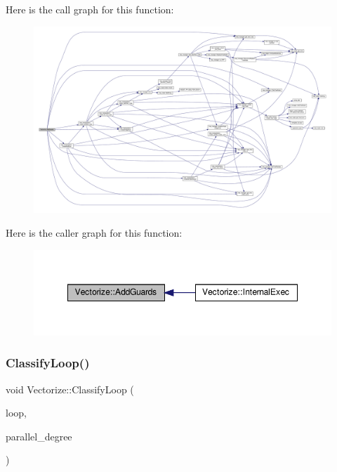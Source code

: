 Here is the call graph for this function\+:
\nopagebreak
\begin{figure}[H]
\begin{center}
\leavevmode
\includegraphics[width=350pt]{d5/da5/classVectorize_a48aec19b5e26bacfd5cc28103057526a_cgraph}
\end{center}
\end{figure}
Here is the caller graph for this function\+:
\nopagebreak
\begin{figure}[H]
\begin{center}
\leavevmode
\includegraphics[width=348pt]{d5/da5/classVectorize_a48aec19b5e26bacfd5cc28103057526a_icgraph}
\end{center}
\end{figure}
\mbox{\label{classVectorize_a0043972f172aca39c296d6a3a4559015}} 
\subsubsection{\texorpdfstring{Classify\+Loop()}{ClassifyLoop()}}
{\footnotesize\ttfamily void Vectorize\+::\+Classify\+Loop (\begin{DoxyParamCaption}\item[{const Loop\+Const\+Ref}]{loop,  }\item[{const \hyperlink{tutorial__fpt__2017_2intro_2sixth_2test_8c_a7c94ea6f8948649f8d181ae55911eeaf}{size\+\_\+t}}]{parallel\+\_\+degree }\end{DoxyParamCaption})\hspace{0.3cm}{\ttfamily [private]}}



